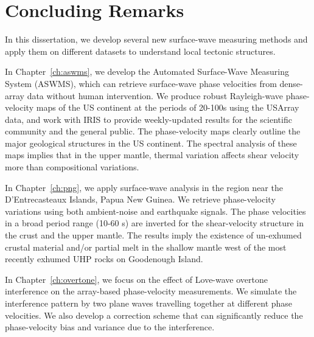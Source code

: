 \documentclass[12pt,oneside]{book}
\begin{document}
\chapter[Conclusion]{Concluding Remarks}
\label{ch:conclusion}
\doublespacing

In this dissertation, we develop several new surface-wave measuring methods and apply them on different datasets to understand local tectonic structures.

In Chapter~\ref{ch:aswms}, we develop the Automated Surface-Wave Measuring System (ASWMS), which can retrieve surface-wave phase velocities from dense-array data without human intervention. We produce robust Rayleigh-wave phase-velocity maps of the US continent at the periods of 20-100s using the USArray data, and work with IRIS to provide weekly-updated results for the scientific community and the general public. The phase-velocity maps clearly outline the major geological structures in the US continent. The spectral analysis of these maps implies that in the upper mantle, thermal variation affects shear velocity more than compositional variations.

In Chapter~\ref{ch:png}, we apply surface-wave analysis in the region near the D'Entrecasteaux Islands, Papua New Guinea. We retrieve phase-velocity variations using both ambient-noise and earthquake signals. The phase velocities in a broad period range (10-60 s) are inverted for the shear-velocity structure in the crust and the upper mantle. The results imply the existence of un-exhumed crustal material and/or partial melt in the shallow mantle west of the most recently exhumed UHP rocks on Goodenough Island.

In Chapter~\ref{ch:overtone}, we focus on the effect of Love-wave overtone interference on the array-based phase-velocity measurements. We simulate the interference pattern by two plane waves travelling together at different phase velocities. We also develop a correction scheme that can significantly reduce the phase-velocity bias and variance due to the interference. 

\cleardoublepage
\normalsize
\singlespacing


\clearpage
\end{document}
